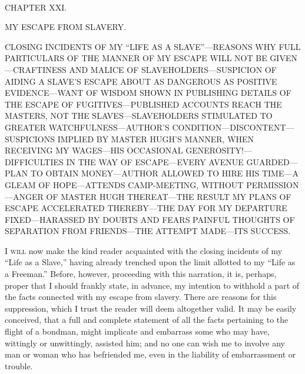 {}

~

{CHAPTER XXI.}

MY ESCAPE FROM SLAVERY.

{CLOSING INCIDENTS OF MY ``LIFE AS A SLAVE''---REASONS WHY FULL
PARTICULARS OF THE MANNER OF MY ESCAPE WILL NOT BE GIVEN---CRAFTINESS
AND MALICE OF SLAVEHOLDERS---SUSPICION OF AIDING A SLAVE'S ESCAPE ABOUT
AS DANGEROUS AS POSITIVE EVIDENCE---WANT OF WISDOM SHOWN IN PUBLISHING
DETAILS OF THE ESCAPE OF FUGITIVES---PUBLISHED ACCOUNTS REACH THE
MASTERS, NOT THE SLAVES---SLAVEHOLDERS STIMULATED TO GREATER
WATCHFULNESS---AUTHOR'S CONDITION---DISCONTENT---SUSPICIONS IMPLIED BY
MASTER HUGH'S MANNER, WHEN RECEIVING MY WAGES---HIS OCCASIONAL
GENEROSITY!---DIFFICULTIES IN THE WAY OF ESCAPE---EVERY AVENUE
GUARDED---PLAN TO OBTAIN MONEY---AUTHOR ALLOWED TO HIRE HIS TIME---A
GLEAM OF HOPE---ATTENDS CAMP-MEETING, WITHOUT PERMISSION---ANGER OF
MASTER HUGH THEREAT---THE RESULT MY PLANS OF ESCAPE ACCELERATED
THEREBY---THE DAY FOR MY DEPARTURE FIXED---HARASSED BY DOUBTS AND FEARS
PAINFUL THOUGHTS OF SEPARATION FROM FRIENDS---THE ATTEMPT MADE---ITS
SUCCESS.}

\textsc{I will} now make the kind reader acquainted with the closing
incidents of my ``Life as a Slave,'' having already trenched upon the
limit allotted to my ``Life as a Freeman.'' Before, however, proceeding
with this narration, it is, perhaps, proper that I should frankly state,
in advance, my intention to withhold a part of the facts connected with
my escape from slavery. There are reasons for this suppression, which I
trust the reader will deem altogether valid. It may be easily conceived,
that a full and complete statement of all the facts pertaining to the
flight of a bondman, might implicate and embarrass some who may {}have,
wittingly or unwittingly, assisted him; and no one can wish me to
involve any man or woman who has befriended me, even in the liability of
embarrassment or trouble.

